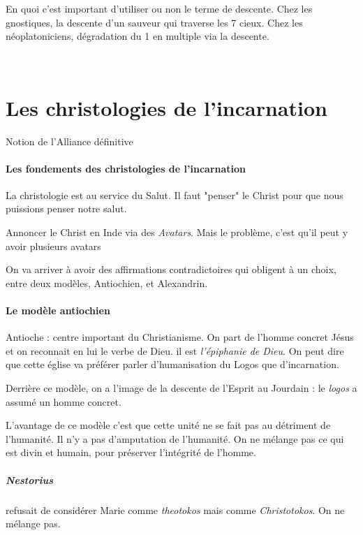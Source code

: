 \begin{Prop}
En quoi c'est important d'utiliser ou non le terme de descente. Chez les gnostiques, la descente d'un sauveur qui traverse les 7 cieux. 
Chez les néoplatoniciens, dégradation du 1 en multiple via la descente.
\end{Prop}
    
      
    
      
    
      
    
  
 ~
  \hypertarget{les-christologies-de-lincarnation}{%
  \section{Les christologies de
  l'incarnation}\label{les-christologies-de-lincarnation}}

Notion de l'Alliance définitive

\paragraph{Les fondements des christologies de l'incarnation}

\begin{Synthesis}
     La christologie est au service du Salut. Il faut "penser" le Christ pour que nous puissions penser notre salut.
\end{Synthesis}

\begin{Ex}
Annoncer le Christ en Inde via des \textit{Avatars}. Mais le problème, c'est qu'il peut y avoir plusieurs avatars
\end{Ex}

On va arriver à avoir des affirmations contradictoires qui obligent à un choix, entre deux modèles, Antiochien, et Alexandrin.

\paragraph{Le modèle antiochien} Antioche : centre important du Christianisme. On part de l'homme concret Jésus et on reconnait en lui le verbe de Dieu. il est \textit{l'épiphanie de Dieu}. On peut dire que cette église va préférer parler d'humanisation du Logos que d'incarnation. 

Derrière ce modèle, on a l'image de la descente de l'Esprit au Jourdain : le \textit{logos} a assumé un homme concret.

L'avantage de ce modèle c'est que cette unité ne se fait pas au détriment de l'humanité. Il n'y a pas d'amputation de l'humanité. On ne mélange pas ce qui est divin et humain, pour préserver l'intégrité de l'homme.
\subparagraph{Nestorius} refusait de considérer Marie comme \textit{theotokos} mais comme \textit{Christotokos}. On ne mélange pas.

